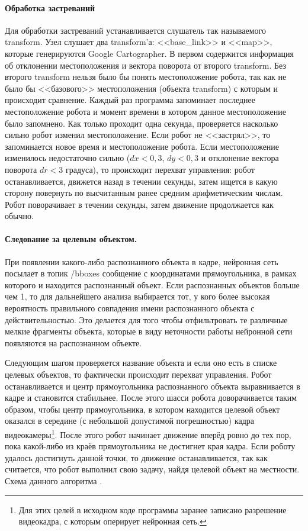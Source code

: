 \paragraph{Обработка застреваний}
Для обработки застреваний устанавливается слушатель так называемого transform. Узел слушает два transform'а: <<base\_link>> и <<map>>, которые генерируются Google Cartographer. В первом содержится информация об отклонении местоположения и вектора поворота от второго transform. Без второго transform нельзя было бы понять местоположение робота, так как не было бы <<базового>> местоположения (объекта transform) с которым и происходит сравнение. Каждый раз программа запоминает последнее местоположение робота и момент времени в котором данное местоположение было запомнено. Как только проходит одна секунда, проверяется насколько сильно робот изменил местоположение. Если робот не <<застрял>>, то запоминается новое время и местоположение робота. Если местоположение изменилось недостаточно сильно ($dx < 0,3$, $dy < 0,3$ и отклонение вектора поворота $dr < 3$ градуса), то происходит перехват управления: робот останавливается, движется назад в течении секунды, затем ищется в какую сторону повернуть по высчитанным ранее средним арифметическим числам. Робот поворачивает в течении секунды, затем движение продолжается как обычно. 

\paragraph{Следование за целевым объектом.} При появлении какого-либо распознанного объекта в кадре, нейронная сеть посылает в топик /bboxes сообщение с координатами прямоугольника, в рамках которого и находится распознанный объект. Если распознанных объектов больше чем 1, то для дальнейшего анализа выбирается тот, у кого более высокая вероятность правильного совпадения имени распознанного объекта с действительностью. Это делается для того чтобы отфильтровать те различные мелкие фрагменты объекта, которые в виду неточности работы нейронной сети появляются на распознанном объекте.

Следующим шагом проверяется название объекта и если оно есть в списке целевых объектов, то фактически происходит перехват управления. Робот останавливается и центр прямоугольника распознанного объекта выравнивается в кадре и становится стабильнее. После этого шасси робота доворачивается таким образом, чтобы центр прямоугольника, в котором находится целевой объект оказался в середине (с небольшой допустимой погрешностью) кадра видеокамеры\footnote{Для этих целей в исходном коде программы заранее записано разрешение видеокадра, с которым оперирует нейронная сеть.}. После этого робот начинает движение вперёд ровно до тех пор, пока какой-либо из краёв прямоугольника не достигнет края кадра. Если роботу удалось достигнуть данной точки, то движение останавливается, так как считается, что робот выполнил свою задачу, найдя целевой объект на местности. Схема данного алгоритма .

